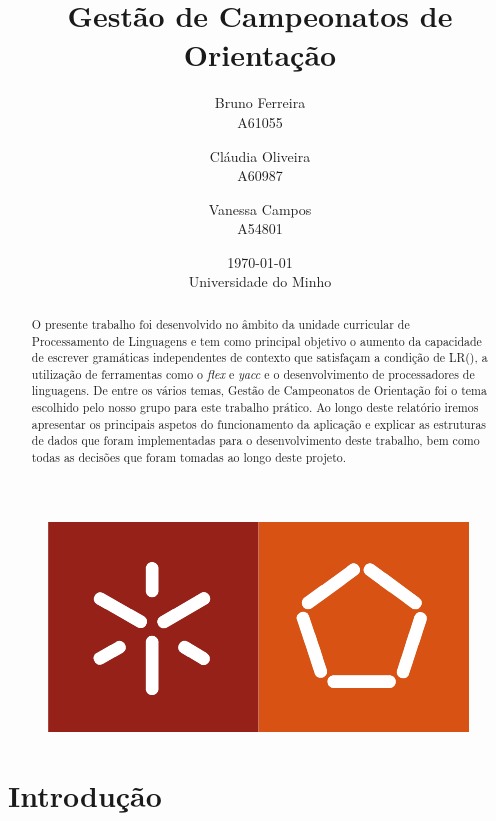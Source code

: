 \documentclass[11pt, a4paper, oneside]{article}
\begin{document}
\title{Gestão de Campeonatos de Orientação}
\date{\today\\Universidade do Minho}
\author{
  Bruno Ferreira\\
  {\small A61055}\\
  \and
  Cláudia Oliveira\\
  {\small A60987}\\
  \and
  Vanessa Campos\\
  {\small A54801}\\
}

\maketitle

\begin{figure}[h]
\begin{center}
\includegraphics[width=0.4\linewidth]{logo}
\end{center}
\end{figure}


\begin{abstract}

  O presente trabalho foi desenvolvido no âmbito da unidade curricular de Processamento de Linguagens e tem como principal objetivo o aumento da capacidade de escrever gramáticas independentes de contexto que satisfaçam a condição de LR(), a utilização de ferramentas como o \emph{flex} e \emph{yacc} e o desenvolvimento de processadores de linguagens. De entre os vários temas, Gestão de Campeonatos de Orientação foi o tema escolhido pelo nosso grupo para este trabalho prático. Ao longo deste relatório iremos apresentar os principais aspetos do funcionamento da aplicação e explicar as estruturas de dados que foram implementadas para o desenvolvimento deste trabalho, bem como todas as decisões que foram tomadas ao longo deste projeto.

\end{abstract}
\newpage

\tableofcontents

\newpage
\section{Introdução}
\end{document}
